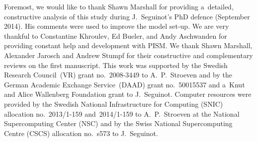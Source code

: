 \documentclass[tc, manuscript]{copernicus}
\begin{document}
\begin{acknowledgements}
      Foremost, we would like to thank Shawn Marshall for providing
      a~detailed, constructive analysis of this study during J.~Seguinot's
      PhD defence (September 2014). His comments were used to improve the
      model set-up. We are very thankful to Constantine Khroulev, Ed Bueler,
      and Andy Aschwanden for providing constant help and development with
      PISM. We thank Shawn Marshall, Alexander Jarosch and Andrew Stumpf for
      their constructive and complementary reviews on the first manuscript.
      This work was supported by the Swedish Research Council~(VR)
      grant no.~2008-3449 to A.~P.~Stroeven and by the German Academic
      Exchange Service~(DAAD) grant no.~50015537 and a~Knut and Alice
      Wallenberg Foundation grant to J.~Seguinot. Computer resources were
      provided by the Swedish National Infrastructure for Computing (SNIC)
      allocation no.~2013/1-159 and~2014/1-159 to A.~P.~Stroeven at the
      National Supercomputing Center (NSC) and by the Swiss National
      Supercomputing Centre (CSCS) allocation no.~s573 to J.~Seguinot.
\end{acknowledgements}
\end{document}
